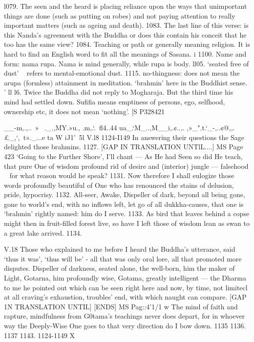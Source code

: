    
   
   l079. The seen and the heard is placing reliance upon the ways that
   unimportant things are done (such as putting on robes) and not paying attention to
   really important matters (such as ageing and death).
   1083. The last line of this verse: is this Nanda's agreement with the Buddha or
   does this contain his conceit that he too has the same view?
   1084. Teaching or path or generally meaning religion. It is hard to ﬁnd an
   English word to fit all the meanings of Sasana. i
   1100. Name and form: nama rupa. Nama is mind generally, while rupa is
   body.
   ll05. `seated free of dust' ~ refers to mental-emotional dust.
   1115. no-thingness: does not mean the arupa (formless) attainment in
   meditation. `brahmin' here in the Buddhist sense. '
   ll l6. Twice the Buddha did not reply to Mogharaja. But the third time his
   mind had settled down. Suﬁﬁa means emptiness of persons, ego, selfhood, ownership
   etc, it does not mean `nothing'.
   \/[S P328421
   
   
   
   __-m,.,..~» ~._.,MY.»u., .m,.`.~ﬂ4..44 ua_.`M_..,M__i,.¢..,. ,»_".t.`_-,..¢@,,.£_,`,~t»._...e   ta W iJ1'~5l%
   V.l8
   1124-I149
   In answering their questions the Sage
   delighted those brahmins. 1127.
   [GAP IN TRANSLATION UNTlL....]
   MS Page 423
   `Going to the Further Shore', I'll chant —
   As He had Seen so did He teach,
   that pure One of wisdom profound
   rid of desire and (interior) jungle —
   falsehood ~ for what reason would he speak? 1131.
   Now therefore I shall eulogize
   those words profoundly beautiful
   of One who has renounced the stains
   of delusion, pride, hypocrisy. 1132.
   All-seer, Awake, Dispeller of dark,
   beyond all being gone, gone to world's end,
   with no inﬂows left, let go of all dukkha-causes,
   that one is `brahmin' rightly named: him do I serve.
   1133.
   As bird that leaves behind a copse
   might then in fruit-ﬁlled forest live,
   so have I left those of wisdom lean
   as swan to a great lake arrived. 1134.
   
   
   
   V.18
   Those who explained to me before
   I heard the Buddha's utterance,
   said `thus it was', `thus will be' -
   all that was only oral lore,
   all that promoted more disputes.
   Dispeller of darkness, seated alone,
   the well-born, him the maker of Light,
   Gotarna, him profoundly wise,
   Gotama, greatly intelligent —
   the Dharma to me he pointed out
   which can be seen right here and now,
   by time, not limitecl at all
   craving's exhaustion, troubles' end,
   with which naught can compare.
   [GAP 1N TRANSLATION UNTIL]
   [ENDS]
   MS Pag::4'1/1
   w
   The mind of faith and rapture, mindfulness
   from G0tama's teachings never does depart,
   for in whoever way the Deeply-Wise One goes
   to that very direction do I bow down.
   1135
   1136.
   1137
   1143.
   1124-1149
   X
   
   
